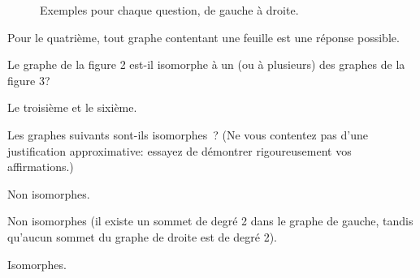 \begin{figure}[!h]
\centering
\scalebox{.825}{}
\caption{Exemples pour chaque question, de gauche à droite.}
\end{figure}

Pour le quatrième, tout graphe contentant une feuille est une réponse possible.


\begin{exo}
Le graphe de la figure 2 est-il isomorphe \`a un (ou \`a plusieurs) des graphes de la figure 3?
\end{exo}

\begin{figure}[!h]
\centering
\scalebox{.825}{}
\caption{}
\end{figure}

\begin{figure}[!h]
\scalebox{.825}{}
\caption{}
\end{figure}

Le troisième et le sixième.

\newpage


\begin{exo}
Les graphes suivants sont-ils isomorphes~? (Ne vous contentez pas d'une justification approximative: essayez de d\'emontrer rigoureusement vos affirmations.)
\end{exo}

\begin{figure}[!h]
\centering

\caption{}
\end{figure}%

Non isomorphes. 

\begin{figure}[!h]
\centering

\caption{}
\end{figure}

Non isomorphes (il existe un sommet de degré 2 dans le graphe de gauche, tandis qu'aucun sommet du graphe de droite est de degré 2).

\begin{figure}[!h]
\centering

\caption{}
\end{figure}

Isomorphes.
